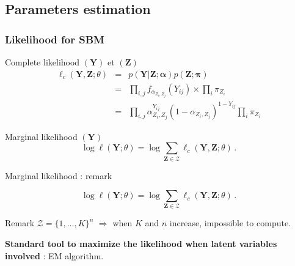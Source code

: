 \documentclass[compress,10pt]{beamer}
\newcommand{\balpha}{\boldsymbol{\alpha}}
\newcommand{\bY}{\mathbf{Y}}
\newcommand{\bX}{\mathbf{Y}}
\newcommand{\bpi}{\mathbf{\pi}}
\newcommand{\bZ}{\mathbf{Z}}
\begin{document}

\subsection{Parameters estimation}

\begin{frame} \frametitle{Likelihood for SBM}

 \begin{block}{Complete  likelihood $(\bY)$  et  $(\bZ)$}
 \begin{eqnarray}\label{eq:lik}
\ell_c(\bY,\bZ; \theta) &=& p(\bY | \bZ; \balpha) p(\bZ ; \bpi)\nonumber  \\
&=& \prod_{i,j} f_{\alpha_{Z_i,Z_j}}(Y_{ij}) \times   \prod_{i} \pi_{Z_i} \nonumber  \\
&=&  \prod_{i,j} \alpha_{Z_i,Z_j}^{Y_{ij}} (1-  \alpha_{Z_i,Z_j})^{1- Y_{ij}}    \prod_{i} \pi_{Z_i} \nonumber
\end{eqnarray}
 
 \end{block}
 

\begin{block}{Marginal likelihood $(\bY)$}
\begin{equation}\label{eq:vraismarg}
\log \ell(\bY; \theta) =\log \sum_{\bZ \in \boldsymbol{\mathcal{Z}}} \ell_c(\bY,\bZ; \theta) \,.
\end{equation}
 \end{block}
 

 \end{frame}
 

 
 
 

 \begin{frame}{Marginal likelihood  : remark }
 
 $$
\log \ell(\bY; \theta) =\log \sum_{\bZ \in \boldsymbol{\mathcal{Z}}} \ell_c(\bX,\bZ; \theta) \,.
$$
 
  \begin{block}{Remark}
$\boldsymbol{\mathcal{Z}} =   \{1,\dots, K\}^{n}$ \color{dgreen} $\Rightarrow$ \color{black}  when  $K$ and $n$ increase, impossible to compute. 
 \end{block}
 
\color{dgreen} \textbf{Standard tool to maximize the likelihood when latent variables involved} \color{black} : EM  algorithm.  
 
 \end{frame}
 
\end{document}
